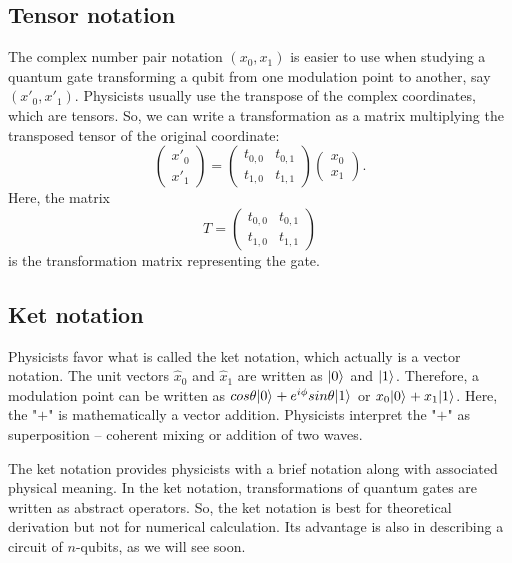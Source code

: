 \documentclass[oneside, letter, 12pt]{book}
\begin{document}
\subsection{Tensor notation}
The complex number pair notation $(x_0, x_1)$ is easier to use when studying a quantum gate transforming a qubit from one modulation point to another, say $(x'_0, x'_1)$. Physicists usually use the transpose of the complex coordinates, which are tensors. So, we can write a transformation as a matrix multiplying the transposed tensor of the original coordinate:
\begin{equation}
    \begin{pmatrix}
    x'_0 \\
    x'_1
\end{pmatrix}
=
    \begin{pmatrix}
    t_{0,0} & t_{0,1} \\
    t_{1,0} & t_{1,1} 
\end{pmatrix}
    \begin{pmatrix}
    x_0 \\
    x_1
\end{pmatrix}.
\end{equation}
Here, the matrix
\begin{equation}\label{e-T}
T
=
    \begin{pmatrix}
    t_{0,0} & t_{0,1} \\
    t_{1,0} & t_{1,1} 
\end{pmatrix}
\end{equation}
is the transformation matrix representing the gate.

\subsection{Ket notation}
Physicists favor what is called the ket notation, which actually is a vector notation. The unit vectors $\hat x_0$ and $\hat x_1$ are written as $\vert {0} \rangle_{}$ and $\vert {1} \rangle_{}$. Therefore, a modulation point can be written as $cos{\theta} \vert {0} \rangle_{} + e^{i \phi} sin{\theta} \vert {1} \rangle_{}$ or $x_0 \vert {0} \rangle_{} + x_1 \vert {1} \rangle_{}$. Here, the "$+$" is mathematically a vector addition. Physicists interpret the "$+$" as superposition -- coherent mixing or addition of two waves.

The ket notation provides physicists with a brief notation along with associated physical meaning. In the ket notation, transformations of quantum gates are written as abstract operators. So, the ket notation is best for theoretical derivation but not for numerical calculation. Its advantage is also in describing a circuit of $n$-qubits, as we will see soon.
\end{document}
